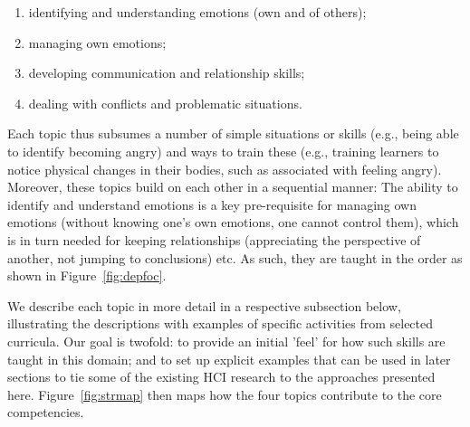 \documentclass[prodmode,acmtochi]{acmsmall}
\begin{document}
\begin{enumerate}
        \item identifying and understanding emotions (own and of others);
        \item managing own emotions;
        \item developing communication and relationship skills;
        \item dealing with conflicts and problematic situations.
\end{enumerate}
 
Each topic thus subsumes a number of simple situations or skills (e.g., being able to identify becoming angry) and ways to train these (e.g., training learners to notice physical changes in their bodies, such as associated with feeling angry).
Moreover, these topics build on each other in a sequential manner: The ability to identify and understand emotions is a key pre-requisite for managing own emotions (without knowing one's own emotions, one cannot control them), which is in turn needed for keeping relationships (appreciating the perspective of another, not jumping to conclusions) etc. As such, they are taught in the order as shown in Figure~\ref{fig:depfoc}. 
%

We describe each topic in more detail in a respective subsection below, illustrating the descriptions with examples of specific activities from selected curricula. Our goal is twofold: to provide an initial 'feel' for how such skills are taught in this domain; and to set up explicit examples that can be used in later sections to tie some of the existing HCI research to the approaches presented here. Figure~\ref{fig:strmap} then maps how the four topics contribute to the core competencies. 
\end{document}
